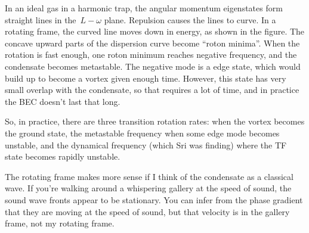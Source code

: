 In an ideal gas in a harmonic trap, the angular momentum eigenstates form straight lines in the~$L-ω$ plane.  Repulsion causes the lines to curve.  In a rotating frame, the curved line moves down in energy, as shown in the figure.  The concave upward parts of the dispersion curve become “roton minima”.  When the rotation is fast enough, one roton minimum reaches negative frequency, and the condensate becomes metastable.  The negative mode is a edge state, which would build up to become a vortex given enough time.  However, this state has very small overlap with the condensate, so that requires a lot of time, and in practice the BEC doesn't last that long.

So, in practice, there are three transition rotation rates: when the vortex becomes the ground state, the metastable frequency when some edge mode becomes unstable, and the dynamical frequency (which Sri was finding) where the TF state becomes rapidly unstable.

The rotating frame makes more sense if I think of the condensate as a classical wave.  If you're walking around a whispering gallery at the speed of sound, the sound wave fronts appear to be stationary.  You can infer from the phase gradient that they are moving at the speed of sound, but that velocity is in the gallery frame, not my rotating frame.

\bye